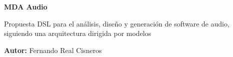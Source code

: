 \documentclass[12pt,a4paper]{report}
\begin{document}
\begin{titlepage}
    \centering
    \vspace*{4cm}
    {\Huge \bfseries MDA Audio \par}
    \vspace{1.5cm}
    {\Large Propuesta DSL para el análisis, diseño y generación de software de audio, siguiendo una arquitectura dirigida por modelos \par}
    \vspace{2cm}
    {\Large \textbf{Autor:} Fernando Real Cisneros \par}
    \vfill
\end{titlepage}



\tableofcontents
\newpage









\appendix


\cleardoublepage
{}
\listoffigures
\end{document}
